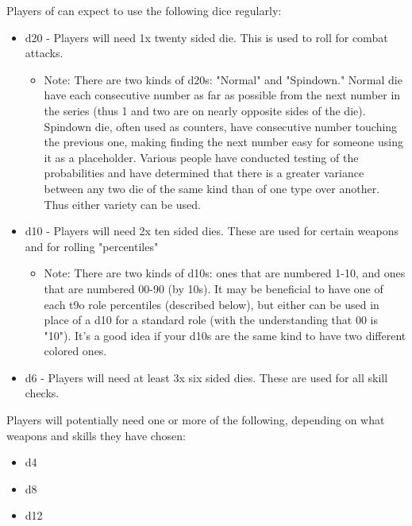 Players of \aq can expect to use the following dice regularly:
\begin{itemize}
\item d20 - Players will need 1x twenty sided die. This is used to roll for combat attacks.
\begin{itemize}
\item Note: There are two kinds of d20s: "Normal" and "Spindown." Normal die have each consecutive number as far as possible from the next number in the series (thus 1 and two are on nearly opposite sides of the die). Spindown die, often used as counters, have consecutive number touching the previous one, making finding the next number easy for someone using it as a placeholder. Various people have conducted testing of the probabilities and have determined that there is a greater variance between any two die of the same kind than of one type over another. Thus either variety can be used.
\end{itemize}
\item d10 - Players will need 2x ten sided dies. These are used for certain weapons and for rolling "percentiles"
\begin{itemize}
\item Note: There are two kinds of d10s: ones that are numbered 1-10, and ones that are numbered 00-90 (by 10s). It may be beneficial to have one of each t9o role percentiles (described below), but either can be used in place of a d10 for a standard role (with the understanding that 00 is "10"). It's a good idea if your d10s are the same kind to have two different colored ones.
\end{itemize}
\item d6 - Players will need at least 3x six sided dies. These are used for all skill checks.
\end{itemize}

Players will potentially need one or more of the following, depending on what weapons and skills they have chosen:
\begin{itemize}
\item d4
\item d8
\item d12
\end{itemize}

